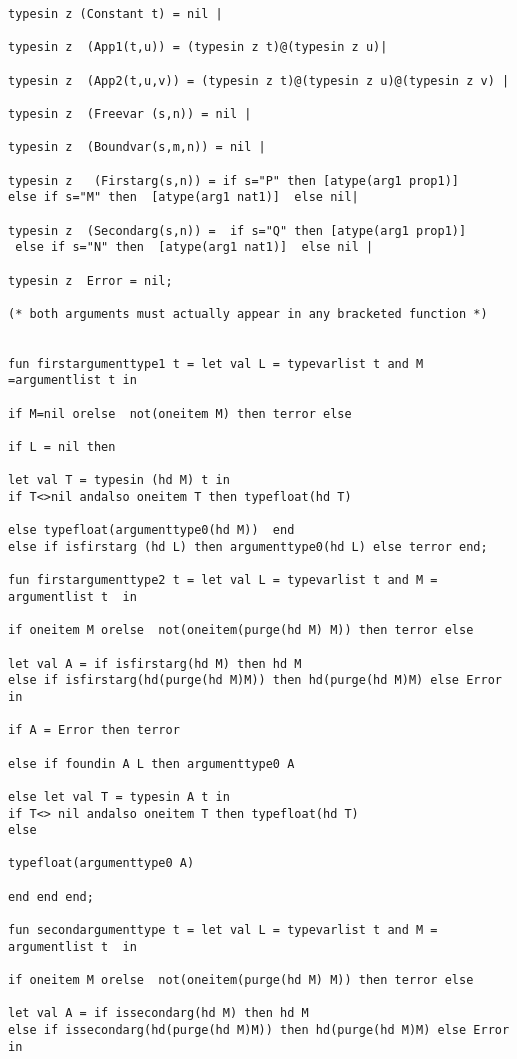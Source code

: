 \documentclass{article}
\begin{document}
{{\begin{verbatim}
typesin z (Constant t) = nil |

typesin z  (App1(t,u)) = (typesin z t)@(typesin z u)|

typesin z  (App2(t,u,v)) = (typesin z t)@(typesin z u)@(typesin z v) |

typesin z  (Freevar (s,n)) = nil |

typesin z  (Boundvar(s,m,n)) = nil |

typesin z   (Firstarg(s,n)) = if s="P" then [atype(arg1 prop1)] 
else if s="M" then  [atype(arg1 nat1)]  else nil|

typesin z  (Secondarg(s,n)) =  if s="Q" then [atype(arg1 prop1)]
 else if s="N" then  [atype(arg1 nat1)]  else nil |

typesin z  Error = nil;

(* both arguments must actually appear in any bracketed function *)


fun firstargumenttype1 t = let val L = typevarlist t and M =argumentlist t in

if M=nil orelse  not(oneitem M) then terror else

if L = nil then 

let val T = typesin (hd M) t in
if T<>nil andalso oneitem T then typefloat(hd T) 

else typefloat(argumenttype0(hd M))  end
else if isfirstarg (hd L) then argumenttype0(hd L) else terror end;

fun firstargumenttype2 t = let val L = typevarlist t and M = argumentlist t  in

if oneitem M orelse  not(oneitem(purge(hd M) M)) then terror else

let val A = if isfirstarg(hd M) then hd M 
else if isfirstarg(hd(purge(hd M)M)) then hd(purge(hd M)M) else Error in

if A = Error then terror

else if foundin A L then argumenttype0 A

else let val T = typesin A t in 
if T<> nil andalso oneitem T then typefloat(hd T)
else 

typefloat(argumenttype0 A)

end end end;

fun secondargumenttype t = let val L = typevarlist t and M = argumentlist t  in

if oneitem M orelse  not(oneitem(purge(hd M) M)) then terror else

let val A = if issecondarg(hd M) then hd M 
else if issecondarg(hd(purge(hd M)M)) then hd(purge(hd M)M) else Error in


\end{verbatim}}}
\end{document}
